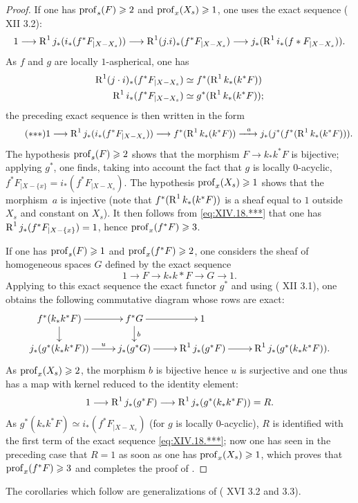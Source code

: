 \begin{proof}
If one has $\operatorname{prof}_s(F)\geqslant 2$ and $\operatorname{prof}_x(X_s)\geqslant 1$, one uses the exact sequence ( XII 3.2):
$$1\to\R^1j_*(i_*(f^*F_{|X-X_s}))\to\R^1(j.i)_*(f^*F_{|X-X_s}) \to j_*(\R^1i_*(f*F_{|X-X_s})).
$$
As $f$ and $g$ are locally $1$-aspherical, one has
\begin{align*}
\operatorname{R}^1(j\cdot i)_*(f^*F_{|X-X_s})&\simeq f^*(\operatorname{R}^1k_*(k^*F)) \\
\operatorname{R}^1i_*(f^*F_{|X-X_s})&\simeq g^*(\operatorname{R}^1k_*(k^*F));
\end{align*}
the preceding exact sequence is then written in the form
%
\begin{equation} \label{eq:XIV.18.***}\tag{${*}{*}{*}$}
1\to\R^1j_*(i_*(f^*F_{|X-X_s}))\to f^*(\R^1k_*(k^*F))\lto{a} j_*(j^*(f^*(\R^1k_*(k^*F))).
\end{equation}
The hypothesis $\operatorname{prof}_s(F)\geqslant 2$ shows that the morphism $F\to k_*k^*F$ is bijective; applying $g^*$, one finds, taking into account the fact that $g$ is locally $0$-acyclic, $f^*F_{|X-\{x\}}=i_*(f^*F_{|X-X_s})$. The hypothesis $\operatorname{prof}_x(X_s)\geqslant 1$ shows that the morphism~$a$ is injective (note that $f^*(\operatorname{R}^1k_*(k^*F))$ is a sheaf equal to $1$ outside $X_s$ and constant on $X_s$). It then follows from \eqref{eq:XIV.18.***} that one has $\operatorname{R}^1j_*(f^*F_{|X-\{x\}})=1$, hence $\operatorname{prof}_x(f^*F)\geqslant 3$.

%
If one has $\operatorname{prof}_s(F)\geqslant 1$ and $\operatorname{prof}_x(f^*F)\geqslant 2$, one considers the sheaf of homogeneous spaces $G$ defined by the exact sequence
$$
1\to F\to k_*k*F\to G\to 1.
$$
Applying to this exact sequence the exact functor $g^*$ and using ( XII 3.1), one obtains the following commutative diagram whose rows are exact:
$$
\xymatrix@R=5mm{f^*(k_*k^*F)\ar[r]\ar[d]&f^*G\ar[r]\ar[d]^b&1\\
j_*(g^*(k_*k^*F))\ar[r]^-{u}&j_*(g^*G)\ar[r]&\R^1j_*(g^*F) \ar[r]&\R^1j_*(g^*(k_*k^*F)).}
$$
As $\operatorname{prof}_x(X_s)\geqslant 2$, the morphism $b$ is bijective hence $u$ is surjective and one thus has a map with kernel reduced to the identity element:
$$
1\to\R^1j_*(g^*F)\to\R^1j_*(g^*(k_*k^*F))=R.
$$
As $g^*(k_*k^*F)\simeq i_*(f^*F_{|X-X_s})$ (for $g$ is locally $0$-acyclic), $R$ is identified with the first term of the exact sequence \eqref{eq:XIV.18.***}; now one has seen in the preceding case that $R=1$ as soon as one has $\operatorname{prof}_x(X_s)\geqslant 1$, which proves that $\operatorname{prof}_x(f^*F)\geqslant 3$ and completes the proof of .
\skipqed
\end{proof}

The corollaries which follow are generalizations of ( XVI 3.2 and 3.3).

